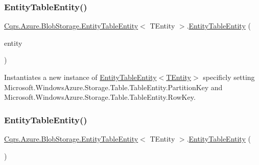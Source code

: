 \subsubsection{\texorpdfstring{Entity\+Table\+Entity()}{EntityTableEntity()}\hspace{0.1cm}{\footnotesize\ttfamily [1/2]}}
{\footnotesize\ttfamily \hyperlink{classCqrs_1_1Azure_1_1BlobStorage_1_1EntityTableEntity}{Cqrs.\+Azure.\+Blob\+Storage.\+Entity\+Table\+Entity}$<$ T\+Entity $>$.\hyperlink{classCqrs_1_1Azure_1_1BlobStorage_1_1EntityTableEntity}{Entity\+Table\+Entity} (\begin{DoxyParamCaption}\item[{T\+Entity}]{entity }\end{DoxyParamCaption})}



Instantiates a new instance of \hyperlink{classCqrs_1_1Azure_1_1BlobStorage_1_1EntityTableEntity_a8d3f730147f5f9b37faeea0840db6a64_a8d3f730147f5f9b37faeea0840db6a64}{Entity\+Table\+Entity$<$\+T\+Entity$>$} specificly setting Microsoft.\+Windows\+Azure.\+Storage.\+Table.\+Table\+Entity.\+Partition\+Key and Microsoft.\+Windows\+Azure.\+Storage.\+Table.\+Table\+Entity.\+Row\+Key. 

\mbox{\label{classCqrs_1_1Azure_1_1BlobStorage_1_1EntityTableEntity_a8a41f6e4ad55a23f9ea68e675ea52c9b_a8a41f6e4ad55a23f9ea68e675ea52c9b}} 
\subsubsection{\texorpdfstring{Entity\+Table\+Entity()}{EntityTableEntity()}\hspace{0.1cm}{\footnotesize\ttfamily [2/2]}}
{\footnotesize\ttfamily \hyperlink{classCqrs_1_1Azure_1_1BlobStorage_1_1EntityTableEntity}{Cqrs.\+Azure.\+Blob\+Storage.\+Entity\+Table\+Entity}$<$ T\+Entity $>$.\hyperlink{classCqrs_1_1Azure_1_1BlobStorage_1_1EntityTableEntity}{Entity\+Table\+Entity} (\begin{DoxyParamCaption}{ }\end{DoxyParamCaption})}



